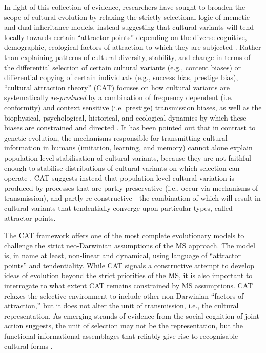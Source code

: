 In light of this collection of evidence, researchers have sought to broaden the scope of cultural evolution by relaxing the strictly selectional logic of memetic and dual-inheritance models, instead suggesting that cultural variants will tend locally towards certain ``attractor points'' depending on the diverse cognitive, demographic, ecological factors of attraction to which they are subjected \citep{Sperber1996}.  Rather than explaining patterns of cultural diversity, stability, and change in terms of the differential selection of certain cultural variants (e.g., content biases) or differential copying of certain individuals (e.g., success bias, prestige bias),  ``cultural attraction theory'' (CAT) focuses on how cultural variants are systematically \textit{re-produced} by a combination of frequency dependent (i.e. conformity) and context sensitive (i.e. prestige) transmission biases, as well as the biophysical, psychological, historical, and ecological dynamics by which these biases are constrained and directed \citep{Claidiere2014}.  It has been pointed out that in contrast to genetic evolution, the mechanisms responsible for transmitting cultural information in humans (imitation, learning, and memory) cannot alone explain population level stabilisation of cultural variants, because they are not faithful enough to stabilise distributions of cultural variants on which selection can operate \cite{Claidiere2014}. CAT suggests instead that population level cultural variation is produced by processes that are partly preservative (i.e., occur via mechanisms of transmission), and partly re-constructive---the combination of which will result in cultural variants that tendentially converge upon particular types, called attractor points.

The CAT framework offers one of the most complete evolutionary models to challenge the strict neo-Darwinian assumptions of the MS approach.  The model is, in name at least, non-linear and dynamical, using language of ``attractor points'' and tendentiality.  While CAT signals a constructive attempt to develop ideas of evolution beyond the strict priorities of the MS, it is also important to interrogate to what extent CAT remains constrained by MS assumptions.  CAT relaxes the selective environment to include other non-Darwinian ``factors of attraction,'' but it does not alter the unit of transmission, i.e., the cultural representation.  As emerging strands of evidence from the social cognition of joint action suggests, the unit of selection may not be the representation, but the functional informational assemblages that reliably give rise to recognisable cultural forms \citep{Kelso2016,Yufik2013,Corning2013,Nowak2017}.

